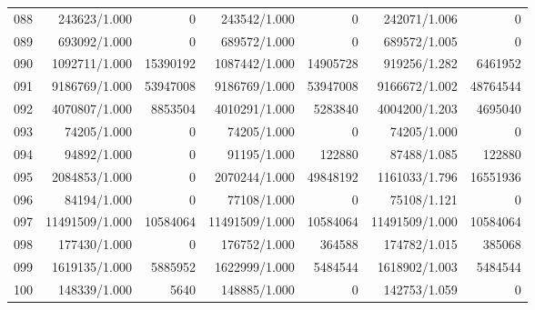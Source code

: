 \begin{longtable}{crrrrrr}
088 & 243623/1.000 & 0 & 243542/1.000 & 0 & 242071/1.006 & 0 \\
089 & 693092/1.000 & 0 & 689572/1.000 & 0 & 689572/1.005 & 0 \\
090 & 1092711/1.000 & 15390192 & 1087442/1.000 & 14905728 & 919256/1.282 & 6461952 \\
091 & 9186769/1.000 & 53947008 & 9186769/1.000 & 53947008 & 9166672/1.002 & 48764544 \\
092 & 4070807/1.000 & 8853504 & 4010291/1.000 & 5283840 & 4004200/1.203 & 4695040 \\
093 & 74205/1.000 & 0 & 74205/1.000 & 0 & 74205/1.000 & 0 \\
094 & 94892/1.000 & 0 & 91195/1.000 & 122880 & 87488/1.085 & 122880 \\
095 & 2084853/1.000 & 0 & 2070244/1.000 & 49848192 & 1161033/1.796 & 16551936 \\
096 & 84194/1.000 & 0 & 77108/1.000 & 0 & 75108/1.121 & 0 \\
097 & 11491509/1.000 & 10584064 & 11491509/1.000 & 10584064 & 11491509/1.000 & 10584064 \\
098 & 177430/1.000 & 0 & 176752/1.000 & 364588 & 174782/1.015 & 385068 \\
099 & 1619135/1.000 & 5885952 & 1622999/1.000 & 5484544 & 1618902/1.003 & 5484544 \\
100 & 148339/1.000 & 5640 & 148885/1.000 & 0 & 142753/1.059 & 0 \\
\end{longtable}

